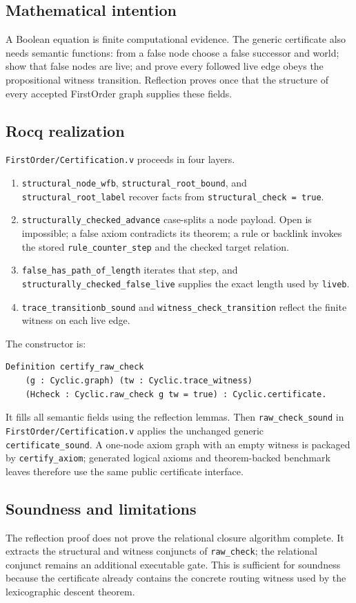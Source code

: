 \documentclass[11pt,oneside]{book}
\DeclareRobustCommand{\code}[1]{\nolinkurl{#1}}
\DeclareRobustCommand{\file}[1]{\nolinkurl{#1}}
\newcommand{\src}[2]{\code{#2} in \file{#1}}
\newcommand{\mathintent}{\subsection*{Mathematical intention}}
\newcommand{\rocqreal}{\subsection*{Rocq realization}}
\newcommand{\soundlim}{\subsection*{Soundness and limitations}}
\begin{document}
\mathintent

A Boolean equation is finite computational evidence.  The generic certificate
also needs semantic functions: from a false node choose a false successor and
world; show that false nodes are live; and prove every followed live edge obeys
the propositional witness transition.  Reflection proves once that the
structure of every accepted FirstOrder graph supplies these fields.

\rocqreal

\file{FirstOrder/Certification.v} proceeds in four layers.
\begin{enumerate}[leftmargin=*]
\item \code{structural_node_wfb}, \code{structural_root_bound}, and
\code{structural_root_label} recover facts from \code{structural_check = true}.
\item \code{structurally_checked_advance} case-splits a node payload.  Open is
impossible; a false axiom contradicts its theorem; a rule or backlink invokes
the stored \code{rule_counter_step} and the checked target relation.
\item \code{false_has_path_of_length} iterates that step, and
\code{structurally_checked_false_live} supplies the exact length used by
\code{liveb}.
\item \code{trace_transitionb_sound} and \code{witness_check_transition}
reflect the finite witness on each live edge.
\end{enumerate}

The constructor is:
\begin{lstlisting}[caption={The graph-to-certificate bridge.}]
Definition certify_raw_check
    (g : Cyclic.graph) (tw : Cyclic.trace_witness)
    (Hcheck : Cyclic.raw_check g tw = true) : Cyclic.certificate.
\end{lstlisting}
It fills all semantic fields using the reflection lemmas.  Then
\src{FirstOrder/Certification.v}{raw_check_sound} applies the unchanged generic
\code{certificate_sound}.  A one-node axiom graph with an empty witness is
packaged by \code{certify_axiom}; generated logical axioms and theorem-backed
benchmark leaves therefore use the same public certificate interface.

\soundlim

The reflection proof does not prove the relational closure algorithm complete.
It extracts the structural and witness conjuncts of \code{raw_check}; the
relational conjunct remains an additional executable gate.  This is sufficient
for soundness because the certificate already contains the concrete routing
witness used by the lexicographic descent theorem.
\end{document}
